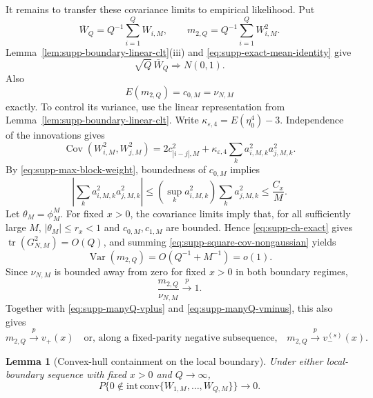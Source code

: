 \documentclass[12pt]{article}
\newtheorem{Lemma}[Proposition]{Lemma}
\theoremstyle{remark}
\begin{document}
It remains to transfer these covariance limits to empirical likelihood. Put
\[
\bar W_Q=Q^{-1}\sum_{i=1}^QW_{i,M},
\qquad
m_{2,Q}=Q^{-1}\sum_{i=1}^QW_{i,M}^2.
\]
Lemma~\ref{lem:supp-boundary-linear-clt}(iii) and \eqref{eq:supp-exact-mean-identity} give
\begin{equation}
\sqrt Q\,\bar W_Q\Rightarrow N(0,1).
\label{eq:supp-manyQ-exact-normal}
\end{equation}
Also
\[
E(m_{2,Q})=c_{0,M}=\nu_{N,M}
\]
exactly. To control its variance, use the linear representation from Lemma~\ref{lem:supp-boundary-linear-clt}. Write $\kappa_{\varepsilon,4}=E(\eta_0^4)-3$. Independence of the innovations gives
\begin{equation}
\operatorname{Cov}(W_{i,M}^2,W_{j,M}^2)
=2c_{|i-j|,M}^2
+\kappa_{\varepsilon,4}\sum_k a_{i,M,k}^2a_{j,M,k}^2.
\label{eq:supp-square-cov-nongaussian}
\end{equation}
By \eqref{eq:supp-max-block-weight}, boundedness of $c_{0,M}$ implies
\[
\left|\sum_k a_{i,M,k}^2a_{j,M,k}^2\right|
\le \left(\sup_k a_{i,M,k}^2\right)\sum_k a_{j,M,k}^2
\le \frac{C_x}{M}.
\]
Let $\theta_M=\phi_M^M$. For fixed $x>0$, the covariance limits imply that, for all sufficiently large $M$, $|\theta_M|\le r_x<1$ and $c_{0,M},c_{1,M}$ are bounded. Hence \eqref{eq:supp-ch-exact} gives $\operatorname{tr}(G_{N,M}^2)=O(Q)$, and summing \eqref{eq:supp-square-cov-nongaussian} yields
\begin{equation*}
\operatorname{Var}(m_{2,Q})
=O(Q^{-1}+M^{-1})=o(1).
\end{equation*}
Since $\nu_{N,M}$ is bounded away from zero for fixed $x>0$ in both boundary regimes,
\begin{equation}
\frac{m_{2,Q}}{\nu_{N,M}}\xrightarrow{p}1.
\label{eq:supp-manyQ-m2-ratio}
\end{equation}
Together with \eqref{eq:supp-manyQ-vplus} and \eqref{eq:supp-manyQ-vminus}, this also gives
\begin{equation*}
m_{2,Q}\xrightarrow{p}v_+(x)
\quad\text{or, along a fixed-parity negative subsequence,}\quad
m_{2,Q}\xrightarrow{p}v_-^{(s)}(x).
\end{equation*}

\begin{Lemma}[Convex-hull containment on the local boundary]
\label{lem:supp-manyQ-hull}
Under either local-boundary sequence with fixed $x>0$ and $Q\to\infty$,
\[
P\{0\notin\mathrm{int}\,\mathrm{conv}\{W_{1,M},\ldots,W_{Q,M}\}\}\longrightarrow0.
\]
\end{Lemma}
\end{document}
